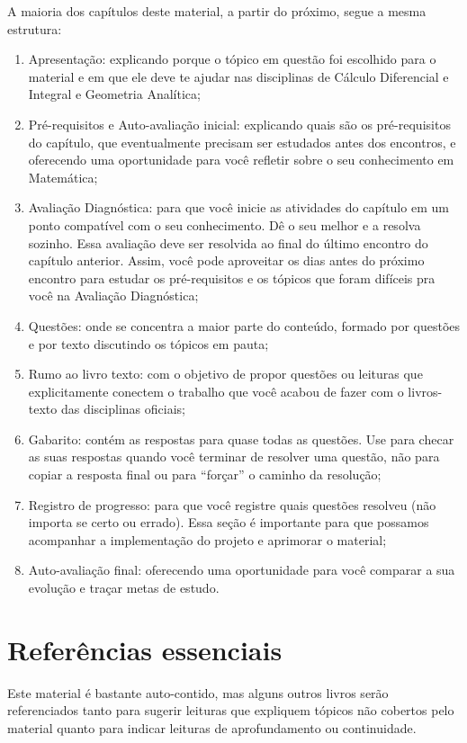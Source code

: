 \documentclass[10pt,openany]{book}
\begin{document}
A maioria dos capítulos deste material, a partir do próximo, segue a mesma estrutura:

\begin{enumerate}
 \item Apresentação: explicando porque o tópico em questão foi escolhido para o material e em que ele deve te ajudar nas disciplinas de Cálculo Diferencial e Integral e Geometria Analítica;
 \item Pré-requisitos e Auto-avaliação inicial: explicando quais são os pré-requisitos do capítulo, que eventualmente precisam ser estudados antes dos encontros, e oferecendo uma oportunidade para você refletir sobre o seu conhecimento em Matemática;
 \item Avaliação Diagnóstica: para que você inicie as atividades do capítulo em um ponto compatível com o seu conhecimento. Dê o seu melhor e a resolva sozinho. Essa avaliação deve ser resolvida ao final do último encontro do capítulo anterior. Assim, você pode aproveitar os dias antes do próximo encontro para estudar os pré-requisitos e os tópicos que foram difíceis pra você na Avaliação Diagnóstica;
 \item Questões: onde se concentra a maior parte do conteúdo, formado por questões e por texto discutindo os tópicos em pauta;
 \item Rumo ao livro texto: com o objetivo de propor questões ou leituras que explicitamente conectem o trabalho que você acabou de fazer com o livros-texto das disciplinas oficiais;
 \item Gabarito: contém as respostas para quase todas as questões. Use para checar as suas respostas quando você terminar de resolver uma questão, não para copiar a resposta final ou para ``forçar'' o caminho da resolução;
 \item Registro de progresso: para que você registre quais questões resolveu (não importa se certo ou errado). Essa seção é importante para que possamos acompanhar a implementação do projeto e aprimorar o material;
 \item Auto-avaliação final: oferecendo uma oportunidade para você comparar a sua evolução e traçar metas de estudo.
\end{enumerate}

\section{Referências essenciais}

Este material é bastante auto-contido, mas alguns outros livros serão referenciados tanto para sugerir leituras que expliquem tópicos não cobertos pelo material quanto para indicar leituras de aprofundamento ou continuidade.
\end{document}

